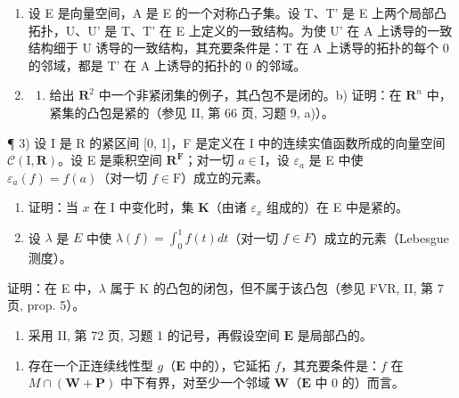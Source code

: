 \exercisegroup

\begin{enumerate}
\def\labelenumi{\arabic{enumi})}
\item
  设 E 是向量空间，A 是 E 的一个对称凸子集。设 T、T' 是 E 上两个局部凸拓扑，U、U' 是 T、T' 在 E 上定义的一致结构。为使 U' 在 A 上诱导的一致结构细于 U 诱导的一致结构，其充要条件是：T 在 A 上诱导的拓扑的每个 0 的邻域，都是 T' 在 A 上诱导的拓扑的 0 的邻域。
\item
  \begin{enumerate}
  \def\labelenumii{\alph{enumii})}
  \tightlist
  \item
    给出 \(\mathbf{R}^2\) 中一个非紧闭集的例子，其凸包不是闭的。b) 证明：在 \(\mathbf{R}^n\) 中，紧集的凸包是紧的（参见 II, 第 66 页, 习题 9, a)）。
  \end{enumerate}
\end{enumerate}

¶ 3) 设 I 是 R 的紧区间 {[}0, 1{]}，F 是定义在 I 中的连续实值函数所成的向量空间 \(\mathcal{C}(\mathrm{I},\mathbf{R})\)。设 E 是乘积空间 \(\mathbf{R}^{\mathbf{F}}\)；对一切 \(a\in\mathrm{I}\)，设 \(\varepsilon_{a}\) 是 E 中使 \(\varepsilon_{a}(f)=f(a)\)（对一切 \(f\in\mathrm{F}\)）成立的元素。

\begin{enumerate}
\def\labelenumi{\alph{enumi})}
\item
  证明：当 \(x\) 在 I 中变化时，集 \(\mathbf{K}\)（由诸 \(\varepsilon_x\) 组成的）在 E 中是紧的。
\item
  设 \(\lambda\) 是 \(E\) 中使 \(\lambda(f) = \int_0^1 f(t)dt\)（对一切 \(f\in F\)）成立的元素（Lebesgue 测度）。
\end{enumerate}

证明：在 E 中，\(\lambda\) 属于 K 的凸包的闭包，但不属于该凸包（参见 FVR, II, 第 7 页, prop. 5）。

\begin{enumerate}
\def\labelenumi{\arabic{enumi})}
\setcounter{enumi}{3}
\tightlist
\item
  采用 II, 第 72 页, 习题 1 的记号，再假设空间 \(\mathbf{E}\) 是局部凸的。
\end{enumerate}

\begin{enumerate}
\def\labelenumi{\alph{enumi})}
\item
  存在一个正连续线性型 \(g\)（\(\mathbf{E}\) 中的），它延拓 \(f\)，其充要条件是：\(f\) 在 \(M \cap (\mathbf{W} + \mathbf{P})\) 中下有界，对至少一个邻域 \(\mathbf{W}\)（\(\mathbf{E}\) 中 0 的）而言。
\end{enumerate}

